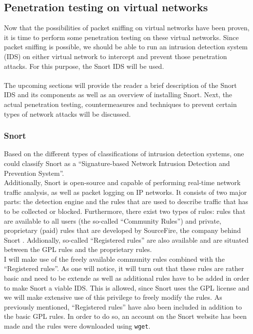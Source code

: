 \subsection{Penetration testing on virtual networks}

Now that the possibilities of packet sniffing on virtual networks have been proven, it is time to perform some penetration testing on these virtual networks. Since packet sniffing is possible, we should be able to run an intrusion detection system (IDS) on either virtual network to intercept and prevent those penetration attacks. For this purpose, the Snort IDS will be used. \\ \\
The upcoming sections will provide the reader a brief description of the Snort IDS and its components as well as an overview of installing Snort. Next, the actual penetration testing, countermeasures and techniques to prevent certain types of network attacks will be discussed. 

\subsubsection{Snort}

Based on the different types of classifications of intrusion detection systems, one could classify Snort as a ``Signature-based Network Intrusion Detection and Prevention System''. \\

Additionally, Snort is open-source and capable of performing real-time network traffic analysis, as well as packet logging on IP networks. It consists of two major parts: the detection engine and the rules that are used to describe traffic that has to be collected or blocked. Furthermore, there exist two types of rules: rules that are available to all users (the so-called ``Community Rules'') and private, proprietary (paid) rules that are developed by SourceFire, the company behind Snort \citep{SnortLicense}. Addionally, so-called ``Registered rules'' are also available and are situated between the GPL rules and the proprietary rules. \\

I will make use of the freely available community rules combined with the ``Registered rules''. As one will notice, it will turn out that these rules are rather basic and need to be extende as well as additional rules have to be added in order to make Snort a viable IDS. This is allowed, since Snort uses the GPL license and we will make extensive use of this privilege to freely modify the rules. As previously mentioned, ``Registered rules'' have also been included in addition to the basic GPL rules. In order to do so, an account on the Snort website has been made and the rules were downloaded using \texttt{wget}. \\ 

